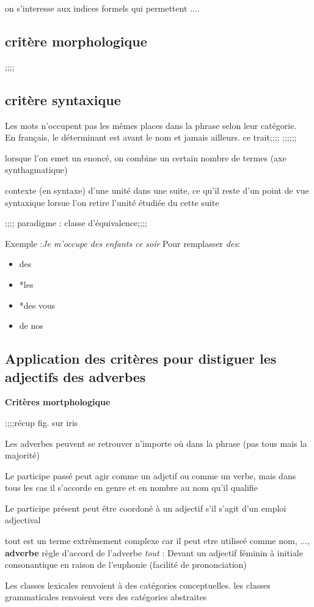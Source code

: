 on s'interesse aux indices formels qui permettent ....
\subsection{critère morphologique}
;;;;
\subsection{critère syntaxique}
Les mots n'occupent pas les mêmes places dans la phrase selon leur catégorie.\\
       En français, le déterminant est avant le nom et jamais ailleurs.
       ce trait;;;;
       ;;;;;;

       lorsque l'on emet un enoncé, on combine un certain nombre de termes (axe synthagmatique)



       contexte (en syntaxe) d'une unité dans une suite, ce qu'il reste d'un point de vue syntaxique lorsue l'on retire l'unité étudiée du cette suite

     ;;;;  paradigme : classe d'équivalence;;;;







Exemple :\textit{Je m'occupe des enfants ce soir}
Pour remplasser \emph{des}:
\begin{itemize}
   \item des
   \item *les 
   \item *des vous
   \item de nos
\end{itemize}

\subsection{Application des critères pour distiguer les adjectifs des adverbes}
\textbf{Critères mortphologique}
\begin{itemize}
;;;;récup fig. sur iris
\end{itemize}

Les adverbes peuvent se retrouver n'importe où dans la phrase (pas tous mais la majorité)


Le participe passé peut agir comme un adjctif ou comme un verbe, mais dans tous les cas il s'accorde en genre et en nombre au nom qu'il qualifie



Le participe présent peut être coordoné à un adjectif s'il s'agit d'un emploi adjectival


tout est un terme extrêmement complexe car il peut etre utiliseé comme nom, ..., \textbf{adverbe}
règle d'accord de l'adverbe \textit{tout} :
Devant un adjectif féminin à initiale consonantique en raison de l'euphonie (facilité de prononciation)



Les classes lexicales renvoient à des catégories conceptuelles.
les classes grammaticales renvoient vers des catégories abstraites
